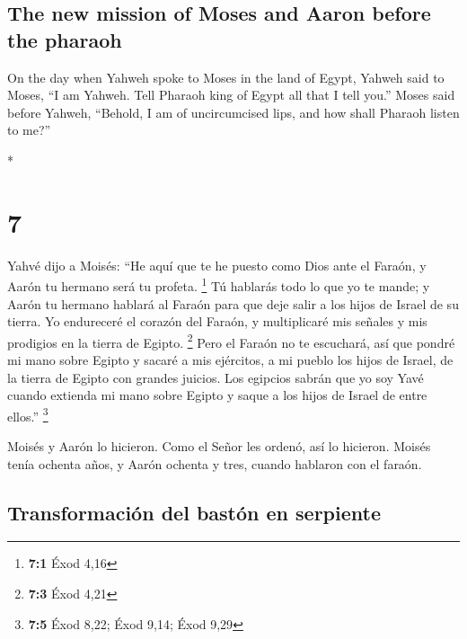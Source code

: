 \begin{paracol}{2}
\begin{otherlanguage}{english}
\hypertarget{the-new-mission-of-moses-and-aaron-before-the-pharaoh}{%
\subsection{The new mission of Moses and Aaron before the
pharaoh}\label{the-new-mission-of-moses-and-aaron-before-the-pharaoh}}

 On the day when Yahweh spoke to Moses in the land of
Egypt,  Yahweh said to Moses, ``I am Yahweh. Tell Pharaoh
king of Egypt all that I tell you.''  Moses said before
Yahweh, ``Behold, I am of uncircumcised lips, and how shall Pharaoh
listen to me?''

\end{otherlanguage}

\switchcolumn[0]*

\hypertarget{section-12}{%
\section{7}\label{section-12}}

 Yahvé dijo a Moisés: ``He aquí que te he puesto como Dios
ante el Faraón, y Aarón tu hermano será tu profeta. \footnote{\textbf{7:1}
  Éxod 4,16}  Tú hablarás todo lo que yo te mande; y Aarón
tu hermano hablará al Faraón para que deje salir a los hijos de Israel
de su tierra.  Yo endureceré el corazón del Faraón, y
multiplicaré mis señales y mis prodigios en la tierra de Egipto.
\footnote{\textbf{7:3} Éxod 4,21}  Pero el Faraón no te
escuchará, así que pondré mi mano sobre Egipto y sacaré a mis ejércitos,
a mi pueblo los hijos de Israel, de la tierra de Egipto con grandes
juicios.  Los egipcios sabrán que yo soy Yavé cuando
extienda mi mano sobre Egipto y saque a los hijos de Israel de entre
ellos.'' \footnote{\textbf{7:5} Éxod 8,22; Éxod 9,14; Éxod 9,29}

 Moisés y Aarón lo hicieron. Como el Señor les ordenó, así
lo hicieron.  Moisés tenía ochenta años, y Aarón ochenta y
tres, cuando hablaron con el faraón.

\hypertarget{transformaciuxf3n-del-bastuxf3n-en-serpiente}{%
\subsection{Transformación del bastón en
serpiente}\label{transformaciuxf3n-del-bastuxf3n-en-serpiente}}


\end{paracol}
